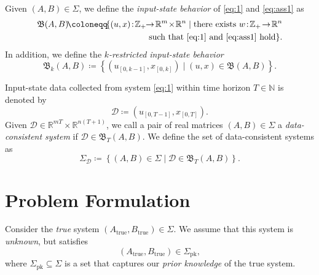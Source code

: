\documentclass[journal,twoside,web]{ieeecolor}
\newcommand{\set}[2]{\left\{#1 \mid #2\right\}}
\begin{document}
Given $(A,B)\in\Sigma$, we define the \emph{input-state behavior} of \eqref{eq:1} and \eqref{eq:ass1} as
\begin{equation}
\begin{split}
\mathfrak{B}(A,B)\!\coloneqq\!\{(u,x)\!:\!\mathbb{Z}_+\!\!\rightarrow\!\mathbb{R}^{m}\!\times\! \mathbb{R}^{n}\mid \textup{there exists }w\!:\!\mathbb{Z}_+\!\rightarrow\!\mathbb{R}^{n}\\
\textup{such that }\eqref{eq:1}\textup{ and }\eqref{eq:ass1}\textup{ hold}\}.
\end{split}
\end{equation}
In addition, we define the \emph{$k$-restricted input-state behavior} 
\begin{equation}
\mathfrak{B}_k(A,B)\coloneqq\set{(u_{[0,k-1]},x_{[0,k]})}{(u,x)\in\mathfrak{B}(A,B)}.
\end{equation}

Input-state data collected from system \eqref{eq:1} within time horizon $T\in\mathbb{N}$ is denoted by
\begin{equation}
\label{eq:data}
\mathcal{D}\coloneqq(u_{[0,T-1]},x_{[0,T]}).
\end{equation}
Given $\mathcal{D}\in\mathbb{R}^{mT}\times\mathbb{R}^{n(T+1)}$, we call a pair of real matrices $(A,B)\in\Sigma$ a \emph{data-consistent system} if $\mathcal{D}\in\mathfrak{B}_T(A,B)$. We define the set of data-consistent systems as
\begin{equation}
\Sigma_\mathcal{D}\coloneqq\set{(A,B)\in\Sigma}{\mathcal{D}\in\mathfrak{B}_T(A,B)}.
\end{equation}

\section{Problem Formulation}
\label{sec:prob}

Consider the \emph{true} system $(A_\text{true},B_\text{true})\in\Sigma$. We assume that this system is \emph{unknown}, but satisfies
\begin{equation}
(A_\text{true},B_\text{true})\in\Sigma_\text{pk},
\end{equation}
where $\Sigma_\text{pk}\subseteq\Sigma$ is a set that captures our \emph{prior knowledge} of the true system. %
\end{document}
